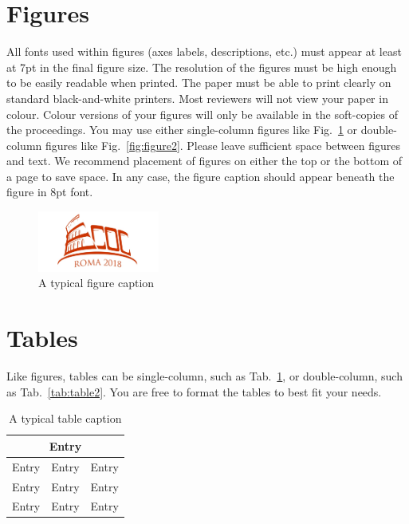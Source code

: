 \documentclass[a4paper, oneside, twocolumn, notitlepage, 10pt]{extarticle_ecoc}
\begin{document}
\section{Figures}

All fonts used within figures (axes labels, descriptions, etc.) must appear at least at 7pt in the final figure size. The resolution of the figures must be high enough to be easily readable when printed. The paper must be able to print clearly on standard black-and-white printers. Most reviewers will not view your paper in colour. Colour versions of your figures will only be available in the soft-copies of the proceedings.
You may use either single-column figures like Fig.~\ref{fig:figure1} or double-column figures like Fig.~\ref{fig:figure2}. Please leave sufficient space between figures and text. We recommend placement of figures on either the top or the bottom of a page to save space. In any case, the figure caption should appear beneath the figure in 8pt font.

\begin{figure}[t]
   \centering
        \includegraphics[width=40mm]{fig1}
    \caption{A typical figure caption}
    \label{fig:figure1}
\end{figure}


\section{Tables}

Like figures, tables can be single-column, such as
Tab.~\ref{tab:table1}, or double-column, such as
Tab.~\ref{tab:table2}. You are free to format the
tables to best fit your needs.

\begin{table}[h]
   \centering
\caption{A typical table caption} \label{tab:table1}
\begin{tabular}{|c|c|c|}
         \hline  \multicolumn{3}{|c|}{\textbf{Entry}}  \\
         \hline  Entry  & Entry & Entry\\
         \hline  Entry  & Entry & Entry\\
         \hline  Entry  & Entry & Entry\\
         \hline
\end{tabular}
\end{table}%
\end{document}
